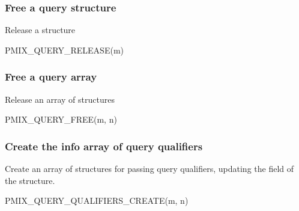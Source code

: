 \subsubsection{Free a query structure}

Release a  structure

\cspecificstart
\begin{codepar}
PMIX_QUERY_RELEASE(m)
\end{codepar}
\cspecificend

\begin{arglist}
\end{arglist}

\subsubsection{Free a query array}

Release an array of  structures

\cspecificstart
\begin{codepar}
PMIX_QUERY_FREE(m, n)
\end{codepar}
\cspecificend

\begin{arglist}
\end{arglist}

\subsubsection{Create the info array of query qualifiers}

Create an array of  structures for passing query qualifiers, updating the  field of the  structure.

\cspecificstart
\begin{codepar}
PMIX_QUERY_QUALIFIERS_CREATE(m, n)
\end{codepar}
\cspecificend

\begin{arglist}
\end{arglist}


